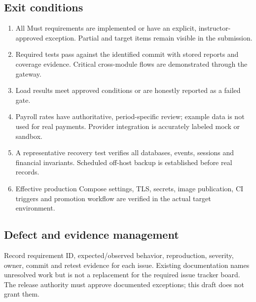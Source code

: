 \documentclass[10pt,a4paper]{article}
\begin{document}
\subsection{Exit conditions}
\begin{enumerate}
\item All Must requirements are implemented or have an explicit, instructor-approved
exception. Partial and target items remain visible in the submission.
\item Required tests pass against the identified commit with stored reports and
coverage evidence. Critical cross-module flows are demonstrated through the gateway.
\item Load results meet approved conditions or are honestly reported as a failed gate.
\item Payroll rates have authoritative, period-specific review; example data is not
used for real payments. Provider integration is accurately labeled mock or sandbox.
\item A representative recovery test verifies all databases, events, sessions and
financial invariants. Scheduled off-host backup is established before real records.
\item Effective production Compose settings, TLS, secrets, image publication, CI
triggers and promotion workflow are verified in the actual target environment.
\end{enumerate}

\subsection{Defect and evidence management}
Record requirement ID, expected/observed behavior, reproduction, severity, owner,
commit and retest evidence for each issue. Existing documentation names unresolved
work but is not a replacement for the required issue tracker board.
The release authority must approve documented exceptions; this draft does not grant them.


\clearpage
\end{document}

